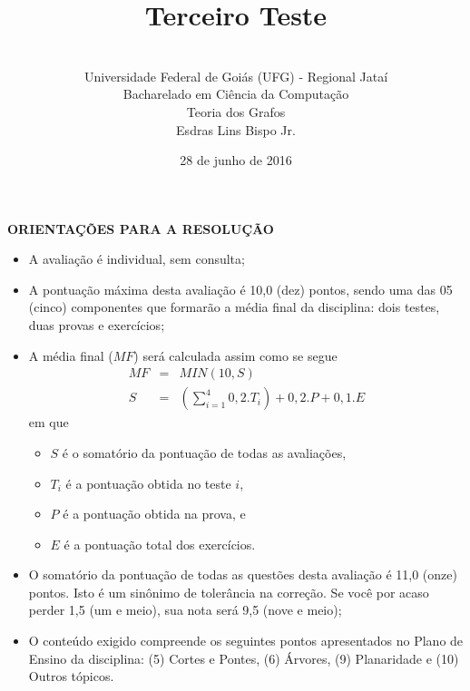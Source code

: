 \documentclass[12pt,a4paper,oneside]{article}
\author{\\Universidade Federal de Goiás (UFG) - Regional Jataí\\Bacharelado em Ciência da Computação \\Teoria dos Grafos \\Esdras Lins Bispo Jr.}
\title{\sc \huge Terceiro Teste}
\date{28 de junho de 2016}
\begin{document}
\maketitle

{\bf ORIENTAÇÕES PARA A RESOLUÇÃO}

\footnotesize

\begin{itemize}
	\item A avaliação é individual, sem consulta;
	\item A pontuação máxima desta avaliação é 10,0 (dez) pontos, sendo uma das 05 (cinco) componentes que formarão a média final da disciplina: dois testes, duas provas e exercícios;
	\item A média final ($MF$) será calculada assim como se segue
	\begin{eqnarray}
		MF & = & MIN(10, S) \nonumber \\
		S & = & (\sum_{i=1}^{4} 0,2.T_i ) + 0,2.P  + 0,1.E \nonumber
	\end{eqnarray}
	em que 
	\begin{itemize}
		\item $S$ é o somatório da pontuação de todas as avaliações,
		\item $T_i$ é a pontuação obtida no teste $i$,
		\item $P$ é a pontuação obtida na prova, e
		\item $E$ é a pontuação total dos exercícios.
	\end{itemize}
	\item O somatório da pontuação de todas as questões desta avaliação é 11,0 (onze) pontos. Isto é um sinônimo de tolerância na correção. Se você por acaso perder 1,5 (um e meio), sua nota será 9,5 (nove e meio);
	\item O conteúdo exigido compreende os seguintes pontos apresentados no Plano de Ensino da disciplina: (5) Cortes e Pontes, (6) Árvores, (9) Planaridade e (10) Outros tópicos.
\end{itemize}

\begin{center}
\end{center}

\newpage

\normalsize
\end{document}
